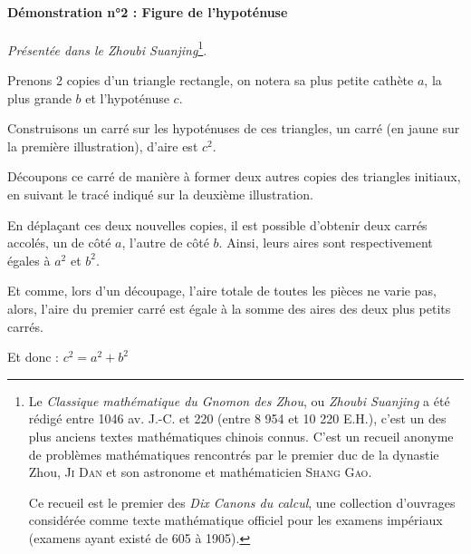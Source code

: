\documentclass[a4paper, twoside]{article}
\begin{document}
\newpage

\paragraph*{Démonstration n°2 : Figure de l'hypoténuse}

\textit{Présentée dans le Zhoubi Suanjing}\footnote{
	Le \textit{Classique mathématique du Gnomon des Zhou}, ou \textit{Zhoubi Suanjing} 
	a été rédigé entre 1046 av. J.-C. et 220 (entre 8 954 et 10 220 E.H.),
	c'est un des plus anciens textes mathématiques chinois connus.
	C'est un recueil anonyme de problèmes mathématiques rencontrés 
	par le premier duc de la dynastie Zhou, \textsc{Ji Dan} et 
	son astronome et mathématicien \textsc{Shang Gao}.
	
	Ce recueil est le premier des \textit{Dix Canons du calcul}, 
	une collection d'ouvrages considérée comme texte 
	mathématique officiel pour les examens impériaux 
(examens ayant existé de 605 à 1905).}.


Prenons 2 copies d'un triangle rectangle, 
on notera sa plus petite cathète $a$, la plus grande $b$ et l'hypoténuse $c$.

\smallbreak

Construisons un carré sur les hypoténuses de ces triangles, 
un carré (en jaune sur la première illustration), d'aire est $c^2$.

Découpons ce carré de manière à former deux autres copies des triangles initiaux,
en suivant le tracé indiqué sur la deuxième illustration.

\smallbreak

En déplaçant ces deux nouvelles copies,
il est possible d'obtenir deux carrés accolés, un de côté $a$, l'autre de côté $b$.
Ainsi, leurs aires sont respectivement égales à $a^2$ et $b^2$.

Et comme, lors d'un découpage, l'aire totale de toutes les pièces ne varie pas,
alors, l'aire du premier carré est égale à la somme des aires des deux plus petits carrés.

\smallbreak

Et donc : $c^2 = a^2 + b^2$
\end{document}
